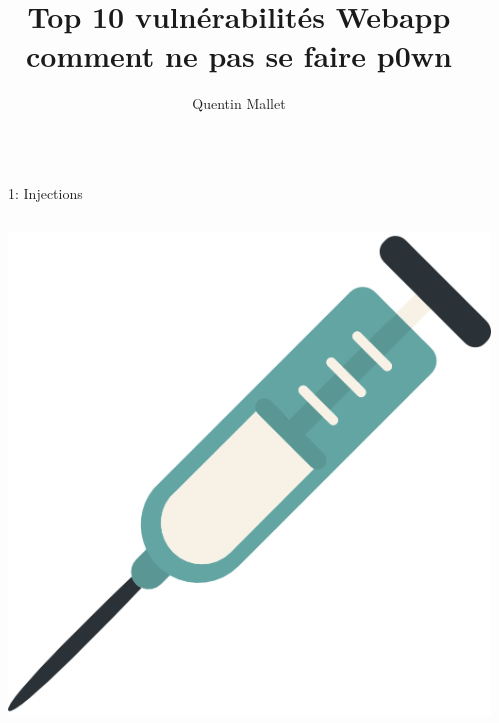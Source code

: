 \documentclass[final,hyperref={pdfpagelabels=false}]{beamer}
\title{\huge Top 10 vulnérabilités Webapp\\comment ne pas se faire p0wn} %
\author{Quentin Mallet} %
\institute{Serli} %
\begin{document}

\begin{frame}[t] %

\begin{columns}[t] %

\begin{column}{.02\textwidth}\end{column} %

\begin{column}{.465\textwidth} %


\begin{block}{1: Injections}

	\begin{columns}

		\begin{column}{.125\textwidth} %
			\includegraphics[scale=0.33]{syringe.png}
		\end{column}


\end{columns}
\end{block}
\end{column}
\end{columns}
\end{frame}
\end{document}
